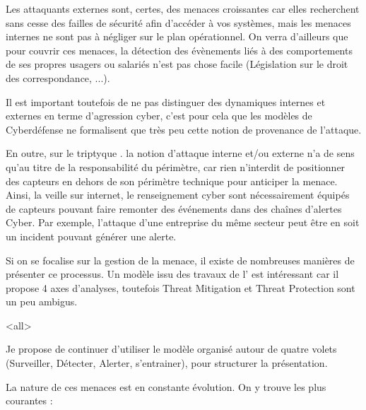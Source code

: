 Les attaquants externes sont, certes, des menaces croissantes car elles recherchent sans cesse des failles de sécurité afin d’accéder à vos systèmes, mais les menaces internes ne sont  pas à négliger sur le plan opérationnel. On verra d'ailleurs que pour couvrir ces menaces, la détection des évènements liés à des comportements de ses propres usagers ou salariés n'est pas chose facile (Législation sur le droit des correspondance,  ...).

Il est important toutefois de ne pas distinguer des dynamiques internes et externes en terme d'agression cyber, c'est pour cela que les modèles de Cyberdéfense ne formalisent que très peu cette notion de provenance de l'attaque.

En outre, sur le triptyque  . la notion d'attaque interne et/ou externe n'a de sens qu'au titre de la responsabilité du périmètre, car rien n'interdit de positionner des capteurs en dehors de son périmètre technique pour anticiper la menace. Ainsi, la veille sur internet, le renseignement cyber sont nécessairement équipés de capteurs pouvant faire remonter des événements dans des chaînes d'alertes Cyber.
Par exemple, l'attaque d'une entreprise du même secteur peut être  en soit un incident pouvant générer une alerte.

Si on se focalise sur la gestion de la menace, il existe de nombreuses manières de présenter ce processus. Un modèle  issu des travaux de l' est intéressant car il propose 4 axes d'analyses, toutefois Threat Mitigation et Threat Protection sont un peu ambigus.


\mode<all>{}

Je propose de continuer d'utiliser le modèle organisé autour de quatre volets (Surveiller, Détecter, Alerter, s'entrainer),  pour structurer la présentation.


La nature de ces menaces est en constante évolution.  On y trouve les plus courantes :

